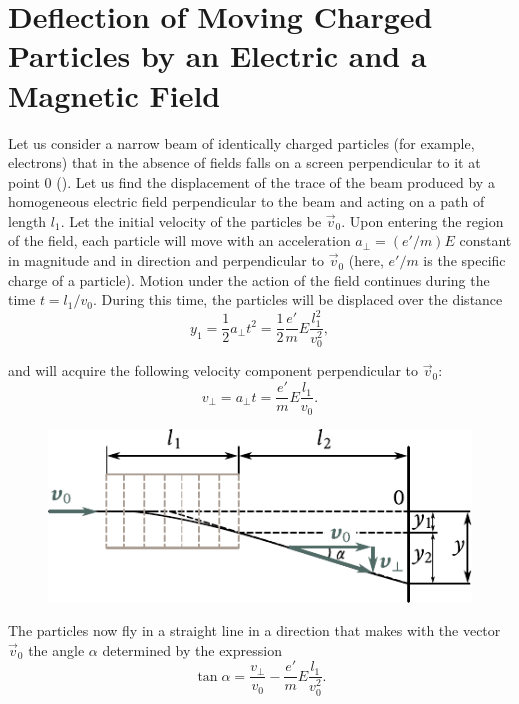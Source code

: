 \section{Deflection of Moving Charged Particles
by an Electric and a Magnetic Field}\label{sec:10_2}

Let us consider a narrow beam of identically charged particles (for example, electrons) that in the absence of fields falls on a screen perpendicular to it at point $0$ ().
Let us find the displacement of the trace of the beam produced by a homogeneous electric field perpendicular to the beam and acting on a path of length $l_1$.
Let the initial velocity of the particles be $\vec{v}_0$.
Upon entering the region of the field, each particle will move with an acceleration $a_{\perp}=(e'/m)E$ constant in magnitude and in direction and perpendicular to $\vec{v}_0$ (here, $e'/m$ is the specific charge of a particle).
Motion under the action of the field continues during the time $t = l_1/v_0$.
During this time, the particles will be displaced over the distance
\begin{equation}\label{eq:10_5}
    y_1 = \frac{1}{2} a_{\perp} t^2 = \frac{1}{2} \frac{e'}{m} E \frac{l_1^2}{v_0^2},
\end{equation}

\noindent
and will acquire the following velocity component perpendicular to $\vec{v}_0$:
\begin{equation*}
    v_{\perp} = a_{\perp} t = \frac{e'}{m} E \frac{l_1}{v_0}.
\end{equation*}

\begin{figure}[t]
	\begin{center}
		\includegraphics[scale=0.98]{figures/ch_10/fig_10_3.pdf}
		\caption[]{}
		\label{fig:10_3}
	\end{center}
	\vspace{-0.85cm}
\end{figure}

The particles now fly in a straight line in a direction that makes with the vector $\vec{v}_0$ the angle $\alpha$ determined by the expression
\begin{equation}\label{eq:10_6}
    \tan\alpha = \frac{v_{\perp}}{v_0} - \frac{e'}{m} E \frac{l_1}{v_0^2}.
\end{equation}

